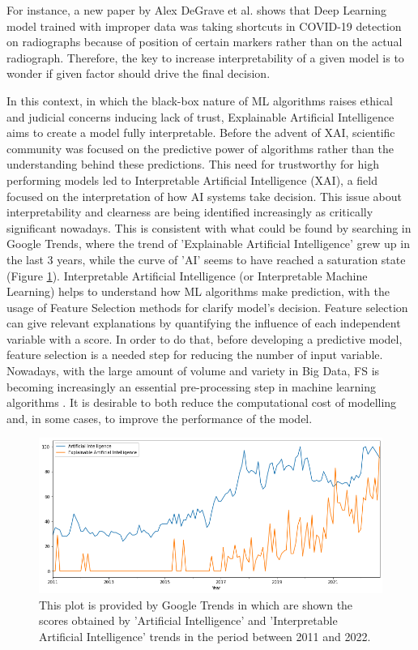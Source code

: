 For instance, a new paper by Alex DeGrave et al.\cite{degrave2021ai} shows that Deep Learning model trained with improper data was taking shortcuts in COVID-19 detection on radiographs because of position of certain markers rather than on the actual radiograph.
Therefore, the key to increase interpretability of a given model is to wonder if given factor should drive the final decision.\par
In this context, in which the black-box nature of ML algorithms raises ethical and judicial concerns inducing lack of trust\cite{9141213}, Explainable Artificial Intelligence aims to create a model fully interpretable.
Before the advent of XAI, scientific community was focused on the predictive power of algorithms rather than the understanding behind these predictions.
This need for trustworthy for high performing models led to  Interpretable Artificial Intelligence (XAI), a field focused on the interpretation of how AI systems take decision.
This issue about interpretability and clearness are being identified increasingly as critically significant nowadays. 
This is consistent with what could be found by searching in Google Trends, where the trend of 'Explainable Artificial Intelligence' grew up in the last 3 years, while the curve of  'AI' seems to have reached a saturation state (Figure \ref{fig:AI_XAI}).
Interpretable Artificial Intelligence (or Interpretable Machine Learning) helps to understand how ML algorithms make prediction, with the usage of Feature Selection methods for clarify model’s decision.
Feature selection can give relevant explanations by quantifying the influence of each independent variable with a score.
In order to do that, before developing a predictive model, feature selection is a needed step for reducing the number of input variable. \newline
Nowadays, with the large amount of volume and variety in Big Data, FS is becoming increasingly an essential pre-processing step in machine learning algorithms \cite{kamolov2021feature}.
It is desirable to both reduce the computational cost of modelling and, in some cases, to improve the performance of the model.\newline
\begin{figure}[H]
    \includegraphics[scale=0.50]{images/AI_XAI.png}
    \caption{This plot is provided by Google Trends in which are shown the scores obtained by 'Artificial Intelligence' and 'Interpretable Artificial Intelligence' trends in the period between 2011 and 2022.}
    \label{fig:AI_XAI}
\end{figure}
